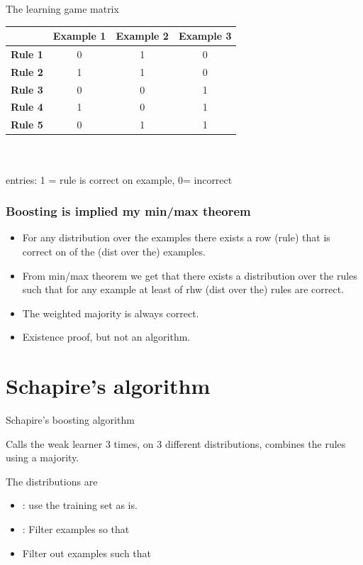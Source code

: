 \documentclass[handout]{beamer}
\begin{document}
\begin{frame}{The learning game matrix}
  \centering
  \begin{tabular}{lccc}
    \hline
    & \textbf{Example 1} & \textbf{Example 2} & \textbf{Example 3} \\
    \hline
    \textbf{Rule 1} & 0 & 1 & 0 \\
    \textbf{Rule 2} & 1 & 1 & 0 \\
    \textbf{Rule 3} & 0 & 0 & 1 \\
    \textbf{Rule 4} & 1 & 0 & 1 \\
    \textbf{Rule 5} & 0 & 1 & 1 \\
    \hline
  \end{tabular}
  ~\\~\\
  
  entries: 1 = rule is correct on example, 0= incorrect
\end{frame}

\begin{frame}
  \frametitle{Boosting is implied my min/max theorem}
  \begin{itemize}
  \item For any distribution  over the examples there exists a row
    (rule) that is correct on  of the (dist over the) examples.
  \item From min/max theorem we get that there exists a distribution  over the rules such that for any example at least of rhw (dist over the) rules are correct.
  \item The weighted majority is always correct.
  \item Existence proof, but not an algorithm.
  \end{itemize}
\end{frame}

\section{Schapire's algorithm}
\begin{frame}{Schapire's boosting algorithm}

  Calls the weak learner 3 times, on 3 different distributions, combines the rules using a majority.

  The distributions are
  \begin{itemize}
  \item {}: use the training set as is.
  \item {}: Filter examples so that 
    \item {} Filter out examples such that 
  \end{itemize}
  
\end{frame}
\end{document}

